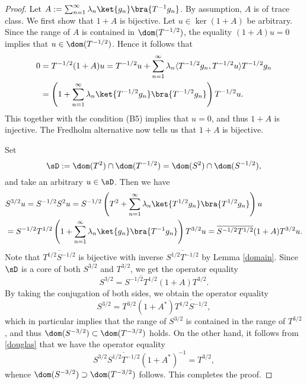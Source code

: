 \documentclass[12pt,draft]{article}
\theoremstyle{plain}
\numberwithin{equation}{section}
\theoremstyle{remark}
\begin{document}
\begin{proof}
Let $A:=\sum_{n=1}^\infty\lambda_n\ket{g_n}\bra{T^{-1}g_n}$.
By assumption, $A$ is of trace class.
We first show that $1+A$ is bijective.
Let $u\in\ker(1+A)$ be arbitrary.
Since the range of $A$ is contained in $\dom(T^{-1/2})$, the equality $(1+A)u=0$ implies that $u\in\dom(T^{-1/2})$.
Hence it follows that
\begin{align*}
0 &= T^{-1/2}(1+A)u = T^{-1/2}u + \sum_{n=1}^\infty\lambda_n\langle T^{-1/2}g_n,T^{-1/2}u\rangle T^{-1/2}g_n\\
&=\left(1+\sum_{n=1}^\infty\lambda_n\ket{T^{-1/2}g_n}\bra{T^{-1/2}g_n}\right)T^{-1/2}u.
\end{align*}
This together with the condition (B5) implies that $u=0$, and thus $1+A$ is injective.
The Fredholm alternative now tells us that $1+A$ is bijective. 

Set
\[
\sD :=\dom(T^2)\cap\dom(T^{-1/2})=\dom(S^2)\cap\dom(S^{-1/2}),
\]
and take an arbitrary $u\in\sD $.
Then we have
\begin{align*}
&S^{3/2}u=S^{-1/2}S^2u=S^{-1/2}\left(T^2+\sum_{n=1}^\infty\lambda_n\ket{T^{1/2}g_n}\bra{T^{1/2}g_n}\right)u\\
&=S^{-1/2}T^{1/2}\left(1+\sum_{n=1}^\infty\lambda_n\ket{g_n}\bra{T^{-1}g_n}\right)T^{3/2}u
=\overline{S^{-1/2}T^{1/2}}(1+A)T^{3/2}u.
\end{align*}
Note that $\overline{T^{1/2}S^{-1/2}}$ is bijective with inverse $\overline{S^{1/2}T^{-1/2}}$ by Lemma \ref{domain}.
Since $\sD $ is a core of both $S^{3/2}$ and $T^{3/2}$, 
we get the operator equality
\[
S^{3/2} = \overline{S^{-1/2}T^{1/2}}(1+A)T^{3/2}.
\]
By taking the conjugation of both sides, we obtain the operator equality
\begin{equation}\label{douglas}
S^{3/2} = T^{3/2}(1+A^*)\overline{T^{1/2}S^{-1/2}},
\end{equation}
which in particular implies that the range of $S^{3/2}$ is contained in the range of $T^{3/2}$,
and thus $\dom(S^{-3/2})\subset\dom(T^{-3/2})$ holds.
On the other hand, it follows from \eqref{douglas} that we have the operator equality
\[
S^{3/2}\overline{S^{1/2}T^{-1/2}}(1+A^*)^{-1} = T^{3/2},
\]
whence $\dom(S^{-3/2})\supset\dom(T^{-3/2})$ follows.
This completes the proof.
\end{proof}
\end{document}
